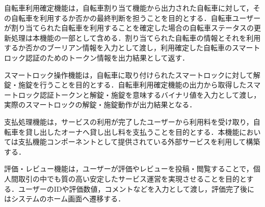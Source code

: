           \par 自転車利用確定機能は，自転車割り当て機能から出力された自転車に対して，その自転車を利用するか否かの最終判断を担うことを目的とする．自転車ユーザーが割り当てられた自転車を利用することを確定した場合の自転車ステータスの更新処理は本機能の一部として含める．割り当てられた自転車の情報とそれを利用するか否かのブーリアン情報を入力として渡し，利用確定した自転車のスマートロック認証のためのトークン情報を出力結果として返す．
          \par スマートロック操作機能は，自転車に取り付けられたスマートロックに対して解錠・施錠を行うことを目的とする．自転車利用確定機能の出力から取得したスマートロック認証トークンと解錠・施錠を意味するバイナリ値を入力として渡し，実際のスマートロックの解錠・施錠動作が出力結果となる．
          \par 支払処理機能は，サービスの利用が完了したユーザーから利用料を受け取り，自転車を貸し出したオーナへ貸し出し料を支払うことを目的とする．本機能においては支払機能コンポーネントとして提供されている外部サービスを利用して構築する．
          \par 評価・レビュー機能は，ユーザーが評価やレビューを投稿・閲覧することで，個人間取引の中でも質の高い安定したサービス運営を実現させることを目的とする．ユーザーのIDや評価数値，コメントなどを入力として渡し，評価完了後にはシステムのホーム画面へ遷移する．
      
